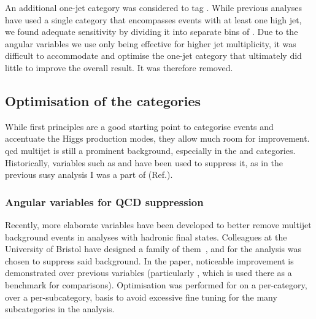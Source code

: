 An additional one-\gls{jet} category was considered to tag \ggH. While previous analyses have used a single category that encompasses events with at least one high \pt jet, we found adequate sensitivity by dividing it into separate bins of \njet. Due to the angular variables we use only being effective for higher \gls{jet} multiplicity, it was difficult to accommodate and optimise the one-jet category that ultimately did little to improve the overall result. It was therefore removed.




\subsection{Optimisation of the categories}
\label{subsec:htoinv_cat_optimisation}

While first principles are a good starting point to categorise events and accentuate the Higgs production modes, they allow much room for improvement. \acrshort{qcd} multijet is still a prominent background, especially in the \ttH and \ggH categories. Historically, variables such as \biasedDPhi and \alphat have been used to suppress it, as in the previous \acrlong{susy} analysis I was a part of (Ref.).




\subsubsection{Angular variables for QCD suppression}
\label{subsubsec:htoinv_ang_var_optimisation}

Recently, more elaborate variables have been developed to better remove multijet background events in analyses with hadronic final states. Colleagues at the University of Bristol have designed a family of them~\cite{Sakuma:2018xrq}, and for the analysis \omegaTilde was chosen to suppress said background. In the paper, noticeable improvement is demonstrated over previous variables (particularly \biasedDPhi, which is used there as a benchmark for comparisons). Optimisation was performed for \omegaTilde on a per-category, over a per-subcategory, basis to avoid excessive fine tuning for the many subcategories in the analysis.

